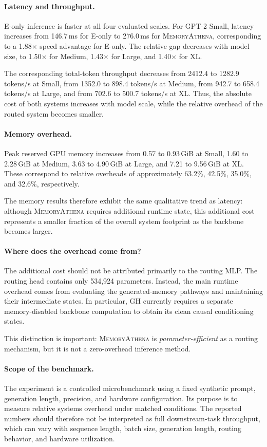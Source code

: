 \paragraph{Latency and throughput.}
E-only inference is faster at all four evaluated scales.
For GPT-2 Small, latency increases from 146.7\,ms for E-only to 276.0\,ms for
\textsc{MemoryAthena}, corresponding to a 1.88$\times$ speed advantage for
E-only. The relative gap decreases with model size, to 1.50$\times$ for
Medium, 1.43$\times$ for Large, and 1.40$\times$ for XL.

The corresponding total-token throughput decreases from 2412.4 to
1282.9 tokens/s at Small, from 1352.0 to 898.4 tokens/s at Medium, from
942.7 to 658.4 tokens/s at Large, and from 702.6 to 500.7 tokens/s at XL.
Thus, the absolute cost of both systems increases with model scale, while the
relative overhead of the routed system becomes smaller.

\paragraph{Memory overhead.}
Peak reserved GPU memory increases from 0.57 to 0.93\,GiB at Small,
1.60 to 2.28\,GiB at Medium, 3.63 to 4.90\,GiB at Large, and
7.21 to 9.56\,GiB at XL.
These correspond to relative overheads of approximately 63.2\%, 42.5\%,
35.0\%, and 32.6\%, respectively.

The memory results therefore exhibit the same qualitative trend as latency:
although \textsc{MemoryAthena} requires additional runtime state, this
additional cost represents a smaller fraction of the overall system footprint
as the backbone becomes larger.

\paragraph{Where does the overhead come from?}
The additional cost should not be attributed primarily to the routing MLP.
The routing head contains only 534,924 parameters. Instead, the main runtime
overhead comes from evaluating the generated-memory pathways and maintaining
their intermediate states. In particular, GH currently requires a separate
memory-disabled backbone computation to obtain its clean causal conditioning
states.

This distinction is important: \textsc{MemoryAthena} is
\emph{parameter-efficient} as a routing mechanism, but it is not a
zero-overhead inference method.

\paragraph{Scope of the benchmark.}
The experiment is a controlled microbenchmark using a fixed synthetic prompt,
generation length, precision, and hardware configuration. Its purpose is to
measure relative systems overhead under matched conditions. The reported
numbers should therefore not be interpreted as full downstream-task
throughput, which can vary with sequence length, batch size, generation length,
routing behavior, and hardware utilization.

